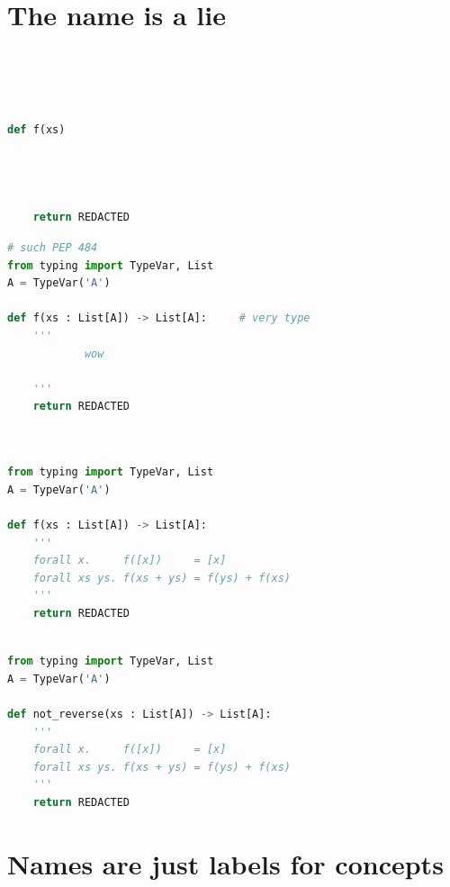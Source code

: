 \documentclass[ignorenonframetext,aspectratio=169]{beamer}
\begin{document}
\part{The name is a lie}

\begin{frame}[fragile]
\begin{lstlisting}[language=Python]




def f(xs)




    return REDACTED
\end{lstlisting}
\end{frame}

\begin{frame}[fragile]
\begin{lstlisting}[language=Python]
# such PEP 484
from typing import TypeVar, List
A = TypeVar('A')

def f(xs : List[A]) -> List[A]:     # very type
    '''
            wow

    '''
    return REDACTED



\end{lstlisting}
\end{frame}

\begin{frame}[fragile]
\begin{lstlisting}[language=Python]

from typing import TypeVar, List
A = TypeVar('A')

def f(xs : List[A]) -> List[A]:
    '''
    forall x.     f([x])     = [x]
    forall xs ys. f(xs + ys) = f(ys) + f(xs)
    '''
    return REDACTED
\end{lstlisting}
\end{frame}

\begin{frame}[fragile]
\begin{lstlisting}[language=Python]

from typing import TypeVar, List
A = TypeVar('A')

def not_reverse(xs : List[A]) -> List[A]:
    '''
    forall x.     f([x])     = [x]
    forall xs ys. f(xs + ys) = f(ys) + f(xs)
    '''
    return REDACTED
\end{lstlisting}
\end{frame}


\part{Names are just labels for concepts}
\end{document}
